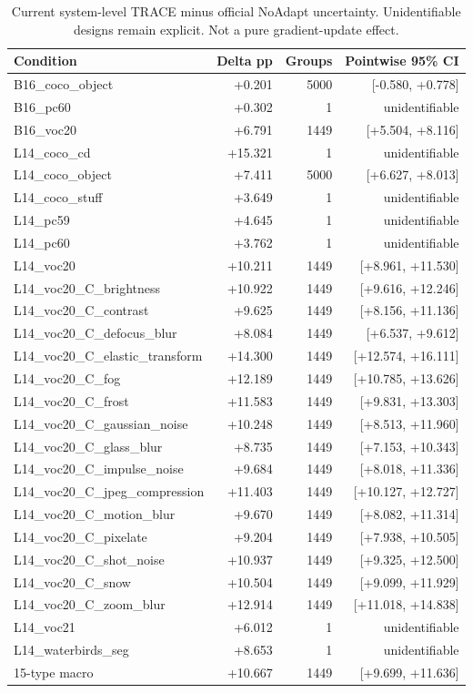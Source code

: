 \begin{table}[htbp]
\centering\scriptsize
\caption{Current system-level TRACE minus official NoAdapt uncertainty. Unidentifiable designs remain explicit. Not a pure gradient-update effect.}
\label{tab:noadapt-ci}
\setlength{\tabcolsep}{4pt}
\begin{tabular}{lrrr}
\toprule
Condition & Delta pp & Groups & Pointwise 95\% CI \\
\midrule
B16\_coco\_object & +0.201 & 5000 & [-0.580, +0.778] \\
B16\_pc60 & +0.302 & 1 & unidentifiable \\
B16\_voc20 & +6.791 & 1449 & [+5.504, +8.116] \\
L14\_coco\_cd & +15.321 & 1 & unidentifiable \\
L14\_coco\_object & +7.411 & 5000 & [+6.627, +8.013] \\
L14\_coco\_stuff & +3.649 & 1 & unidentifiable \\
L14\_pc59 & +4.645 & 1 & unidentifiable \\
L14\_pc60 & +3.762 & 1 & unidentifiable \\
L14\_voc20 & +10.211 & 1449 & [+8.961, +11.530] \\
L14\_voc20\_C\_brightness & +10.922 & 1449 & [+9.616, +12.246] \\
L14\_voc20\_C\_contrast & +9.625 & 1449 & [+8.156, +11.136] \\
L14\_voc20\_C\_defocus\_blur & +8.084 & 1449 & [+6.537, +9.612] \\
L14\_voc20\_C\_elastic\_transform & +14.300 & 1449 & [+12.574, +16.111] \\
L14\_voc20\_C\_fog & +12.189 & 1449 & [+10.785, +13.626] \\
L14\_voc20\_C\_frost & +11.583 & 1449 & [+9.831, +13.303] \\
L14\_voc20\_C\_gaussian\_noise & +10.248 & 1449 & [+8.513, +11.960] \\
L14\_voc20\_C\_glass\_blur & +8.735 & 1449 & [+7.153, +10.343] \\
L14\_voc20\_C\_impulse\_noise & +9.684 & 1449 & [+8.018, +11.336] \\
L14\_voc20\_C\_jpeg\_compression & +11.403 & 1449 & [+10.127, +12.727] \\
L14\_voc20\_C\_motion\_blur & +9.670 & 1449 & [+8.082, +11.314] \\
L14\_voc20\_C\_pixelate & +9.204 & 1449 & [+7.938, +10.505] \\
L14\_voc20\_C\_shot\_noise & +10.937 & 1449 & [+9.325, +12.500] \\
L14\_voc20\_C\_snow & +10.504 & 1449 & [+9.099, +11.929] \\
L14\_voc20\_C\_zoom\_blur & +12.914 & 1449 & [+11.018, +14.838] \\
L14\_voc21 & +6.012 & 1 & unidentifiable \\
L14\_waterbirds\_seg & +8.653 & 1 & unidentifiable \\
15-type macro & +10.667 & 1449 & [+9.699, +11.636] \\
\bottomrule
\end{tabular}
\end{table}

